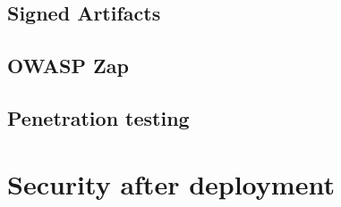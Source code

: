\subsection{Signed Artifacts}


\subsection{OWASP Zap}


\subsection{Penetration testing}

\section{Security after deployment}

